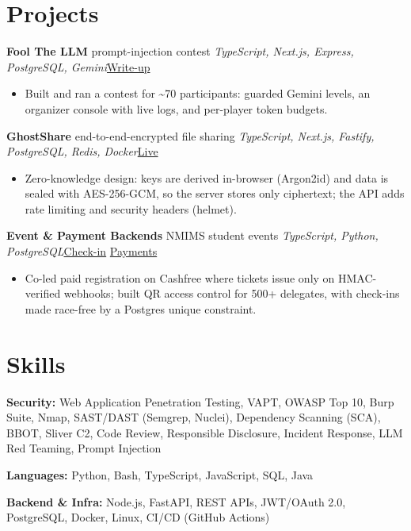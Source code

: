 \documentclass[10pt, a4paper]{article}
\newcommand{\proj}[4]{\par\vspace{2.5pt}\textbf{#1} \textbar{} #2 \textbar{} \textit{\small #3}\hfill{\small #4}\par}
\newcommand{\lnk}[2]{\href{#1}{\color{linkc}#2}}
\begin{document}
\section{Projects}
\proj{Fool The LLM}{prompt-injection contest}{TypeScript, Next.js, Express, PostgreSQL, Gemini}{\lnk{https://jkartik.in/blog/where-llm-guardrails-break/}{Write-up}}
\begin{itemize}
  \item Built and ran a contest for \textasciitilde{}70 participants: guarded Gemini levels, an organizer console with live logs, and per-player token budgets.
\end{itemize}
\proj{GhostShare}{end-to-end-encrypted file sharing}{TypeScript, Next.js, Fastify, PostgreSQL, Redis, Docker}{\lnk{https://share.jkartik.in}{Live}}
\begin{itemize}
  \item Zero-knowledge design: keys are derived in-browser (Argon2id) and data is sealed with AES-256-GCM, so the server
  stores only ciphertext; the API adds rate limiting and security headers (helmet).
\end{itemize}
\proj{Event \& Payment Backends}{NMIMS student events}{TypeScript, Python, PostgreSQL}{\lnk{https://github.com/Social-Conclave/conc-qr}{Check-in}\,\textbar\,\lnk{https://github.com/MPSTME-ACM/pfe-regi}{Payments}}
\begin{itemize}
  \item Co-led paid registration on Cashfree where tickets issue only on HMAC-verified webhooks; built QR access control for
  500+ delegates, with check-ins made race-free by a Postgres unique constraint.
\end{itemize}

\section{Skills}
\textbf{Security:} Web Application Penetration Testing, VAPT, OWASP Top 10, Burp Suite, Nmap, SAST/DAST (Semgrep, Nuclei), Dependency Scanning (SCA), BBOT,
Sliver C2, Code Review, Responsible Disclosure, Incident Response, LLM Red Teaming, Prompt Injection\par
\textbf{Languages:} Python, Bash, TypeScript, JavaScript, SQL, Java\par
\textbf{Backend \& Infra:} Node.js, FastAPI, REST APIs, JWT/OAuth 2.0, PostgreSQL, Docker, Linux, CI/CD (GitHub Actions)
\end{document}
